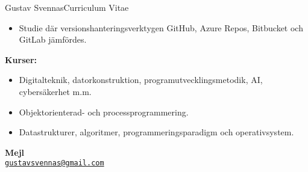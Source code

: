 \documentclass{article}
\begin{document}
\begin{cv}{Gustav Svennas}{Curriculum Vitae}

\begin{cvevent}[2023-04][2023-06]
    \begin{itemize}
        \item Studie där versionshanteringsverktygen GitHub, Azure Repos, Bitbucket och GitLab jämfördes.
    \end{itemize}
\end{cvevent}

\begin{cvevent}[2018-09][2023-06]
    \textbf{Kurser:}
    \begin{itemize}
        \item Digitalteknik, datorkonstruktion, programutvecklingsmetodik, AI, cybersäkerhet m.m.
        \item Objektorienterad- och processprogrammering. 
        \item Datastrukturer, algoritmer, programmeringsparadigm och operativsystem.
    \end{itemize}
\end{cvevent}

\begin{cvevent}[2012-09][2015-06]
\end{cvevent}


\begin{cvevent}[2017-06][2020-06]
\end{cvevent}


\cvsidebar %



\begin{cvitem}[Envelope][4]
    \textbf{Mejl}\\
    \href{mailto:gustavsvennas@gmail.com}{\texttt{gustavsvennas@gmail.com}}
\end{cvitem}


\end{cv}
\end{document}
